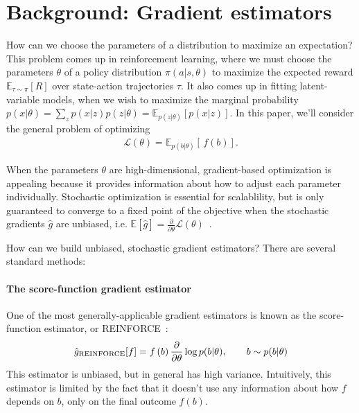 \documentclass{article}
\newcommand{\discreteDist}{p(b|\theta)}
\newcommand{\loss}{f(b)}
\newcommand{\expectedLoss}{\mathbb{E}_{\discreteDist{}} \! \left[ \, \loss{} \right]}
\newcommand{\PT}{\frac{\partial}{\partial \theta}}
\begin{document}
\section{Background: Gradient estimators}
How can we choose the parameters of a distribution to maximize an expectation?
This problem comes up in reinforcement learning, where we must choose the parameters $\theta$ of a policy distribution $\pi(a|s, \theta)$ to maximize the expected reward $\mathbb{E}_{\tau \sim \pi} \left[ R \right]$ over state-action trajectories $\tau$.
It also comes up in fitting latent-variable models, when we wish to maximize the marginal probability ${p(x|\theta) = \sum_z p(x|z) p(z|\theta) = \mathbb{E}_{p(z|\theta)} \left[ p(x|z) \right]}$.
In this paper, we'll consider the general problem of optimizing
%
\begin{align}
\mathcal{L}(\theta) = \expectedLoss{}.
\end{align}

When the parameters $\theta$ are high-dimensional, gradient-based optimization is appealing because it provides information about how to adjust each parameter individually.
Stochastic optimization is essential for scalablility, but is only guaranteed to converge to a fixed point of the objective when the stochastic gradients $\hat g$ are unbiased, i.e. ${\mathbb{E} \left[ \hat g \right] = \PT \mathcal{L}(\theta)}$~\citep{robbins1951stochastic}.

How can we build unbiased, stochastic gradient estimators?
There are several standard methods:

\paragraph{The score-function gradient estimator}
One of the most generally-applicable gradient estimators is known as the score-function estimator, or REINFORCE~\citep{williams1992simple}:
%
\begin{align}
\hat g_\textnormal{REINFORCE}[f] =  f \left( b \right) \PT \log p(b | \theta), \qquad b \sim p(b | \theta)
\end{align}
%
This estimator is unbiased, but in general has high variance.
Intuitively, this estimator is limited by the fact that it doesn't use any information about how $f$ depends on $b$, only on the final outcome $f(b)$.
\end{document}
